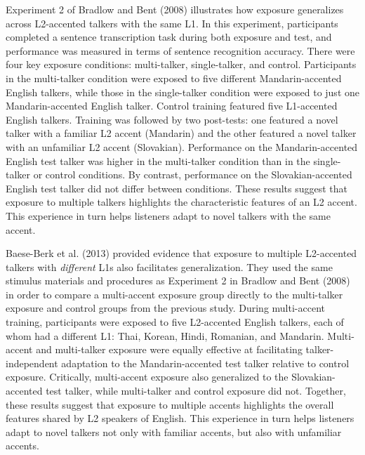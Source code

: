 \documentclass[
  12pt,
  twoside]{article}
\begin{document}
Experiment 2 of Bradlow and Bent (2008) illustrates how exposure generalizes across L2-accented talkers with the same L1.
In this experiment, participants completed a sentence transcription task during both exposure and test, and performance was measured in terms of sentence recognition accuracy.
There were four key exposure conditions: multi-talker, single-talker, and control.
Participants in the multi-talker condition were exposed to five different Mandarin-accented English talkers, while those in the single-talker condition were exposed to just one Mandarin-accented English talker.
Control training featured five L1-accented English talkers.
Training was followed by two post-tests: one featured a novel talker with a familiar L2 accent (Mandarin) and the other featured a novel talker with an unfamiliar L2 accent (Slovakian).
Performance on the Mandarin-accented English test talker was higher in the multi-talker condition than in the single-talker or control conditions.
By contrast, performance on the Slovakian-accented English test talker did not differ between conditions.
These results suggest that exposure to multiple talkers highlights the characteristic features of an L2 accent.
This experience in turn helps listeners adapt to novel talkers with the same accent.

Baese-Berk et al. (2013) provided evidence that exposure to multiple L2-accented talkers with \emph{different} L1s also facilitates generalization.
They used the same stimulus materials and procedures as Experiment 2 in Bradlow and Bent (2008) in order to compare a multi-accent exposure group directly to the multi-talker exposure and control groups from the previous study.
During multi-accent training, participants were exposed to five L2-accented English talkers, each of whom had a different L1: Thai, Korean, Hindi, Romanian, and Mandarin.
Multi-accent and multi-talker exposure were equally effective at facilitating talker-independent adaptation to the Mandarin-accented test talker relative to control exposure.
Critically, multi-accent exposure also generalized to the Slovakian-accented test talker, while multi-talker and control exposure did not.
Together, these results suggest that exposure to multiple accents highlights the overall features shared by L2 speakers of English.
This experience in turn helps listeners adapt to novel talkers not only with familiar accents, but also with unfamiliar accents.
\end{document}
